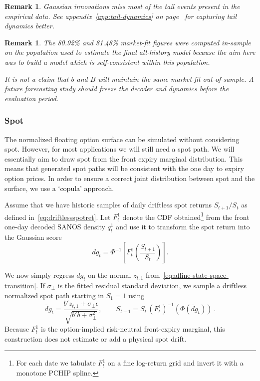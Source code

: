 \documentclass[11pt,a4paper]{article}
\newtheorem{remark}[definition]{Remark}
\begin{document}
\begin{remark}
  Gaussian innovations miss most of the tail events present in the empirical data. See appendix~\ref{app:tail-dynamics} on page~\pageref{app:tail-dynamics}
  for capturing tail dynamics better.
\end{remark}

\begin{remark}
The 80.92\% and 81.48\% market-fit figures were computed in-sample on the population used to estimate
the final all-history model because the aim here was to build a model which is self-consistent within this population. 

It is not a claim that $b$ and $B$ will maintain the same market-fit out-of-sample.
A future forecasting study should freeze the decoder and dynamics
before the evaluation period.
\end{remark}

\subsubsection{Spot}

The normalized floating option surface can be simulated without considering spot. 
However, for most  applications we will still need a spot path. We will essentially aim to draw
spot from the front expiry marginal distribution. This means that generated spot paths will be consistent with the one day to expiry option prices.
In order to ensure a correct joint distribution between spot and the surface, we use a `copula' approach.

Assume that we have historic samples of daily driftless spot returns $S_{t+1}/S_t$  as defined in~\eqref{eq:driftlessspotret}.  
Let
$F_t^1$ denote the CDF obtained\footnote{For each date we tabulate
$F_t^1$ on a fine log-return grid and invert it with a monotone PCHIP spline.} from the front one-day decoded SANOS density $q_t^1$ and use it 
to transform the spot return into the Gaussian score
\begin{equation}
  dg_t =\Phi^{-1}\!\left[
    F_t^1\!\left(\frac{S_{t+1}}{S_t}\right)
  \right].
  \label{eq:front-spot-score}
\end{equation}

We now simply regress $dg_t$ on the normal $z_{t,1}$ from~\eqref{eq:affine-state-space-transition}. If $\sigma_\perp$ is the fitted residual
standard deviation, we sample a driftless normalized spot path starting in $S_1=1$ using
\begin{equation}
  \bar dg_t=\frac{b'z_{t,1}+\sigma_\perp\epsilon}
          {\sqrt{b'b+\sigma_\perp^2}},
  \qquad
  S_{t+1}
    =S_t\, (F_t^1)^{-1}\!\left(\Phi(\bar dg_t)\right) \ . 
  \label{eq:spot-block}
\end{equation}
Because $F_t^1$ is the option-implied risk-neutral front-expiry marginal, this
construction does not estimate or add a physical spot drift.  
\end{document}

